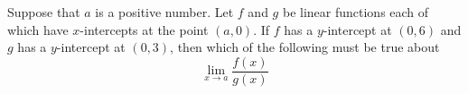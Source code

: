 \documentclass{ximera}
\author{Bobby Ramsey}
\begin{document}
\begin{exercise}	
Suppose that $a$ is a positive number.  Let $f$ and $g$ be linear functions each of which have $x$-intercepts at the point $(a,0)$.
If $f$ has a $y$-intercept at $(0,6)$ and $g$ has a $y$-intercept at $(0,3)$, then which of the following must be true about
\[ \lim_{x\to a} \frac{f(x)}{g(x)}  \]
	

		\begin{multipleChoice}
		\end{multipleChoice}
	
\end{exercise}
\end{document}
